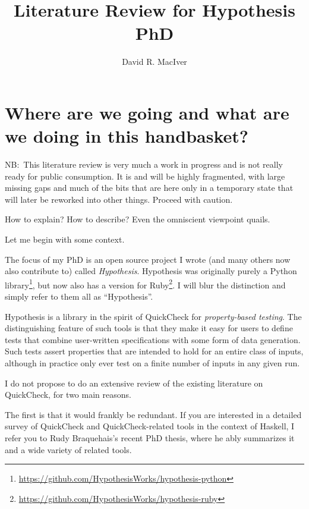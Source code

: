 

\title{Literature Review for Hypothesis PhD}
\author{David R. MacIver}



\maketitle

\tableofcontents

\chapter{Where are we going and what are we doing in this handbasket?}

NB:\ This literature review is very much a work in progress and is not really ready for public consumption.
It is and will be highly fragmented,
with large missing gaps and much of the bits that are here only in a temporary state that will later be reworked into other things.
Proceed with caution.

How to explain? How to describe? Even the omniscient viewpoint quails\cite{0812515285}.

Let me begin with some context.

The focus of my PhD is an open source project I wrote (and many others now also contribute to) called \emph{Hypothesis}.
Hypothesis was originally purely a Python library\footnote{\url{https://github.com/HypothesisWorks/hypothesis-python}},
but now also has a version for Ruby\footnote{\url{https://github.com/HypothesisWorks/hypothesis-ruby}}.
I will blur the distinction and simply refer to them all as ``Hypothesis''.

Hypothesis is a library in the spirit of QuickCheck\cite{DBLP:conf/icfp/ClaessenH00} for \emph{property-based testing}.
The distinguishing feature of such tools is that they make it easy for users to define tests that combine user-written specifications with some form of data generation.
Such tests assert properties that are intended to hold for an entire class of inputs,
although in practice only ever test on a finite number of inputs in any given run.

I do not propose to do an extensive review of the existing literature on QuickCheck,
for two main reasons.

The first is that it would frankly be redundant.
If you are interested in a detailed survey of QuickCheck and QuickCheck-related tools in the context of Haskell,
I refer you to Rudy Braquehais's recent PhD thesis\cite{matela2017tools},
where he ably summarizes it and a wide variety of related tools.

